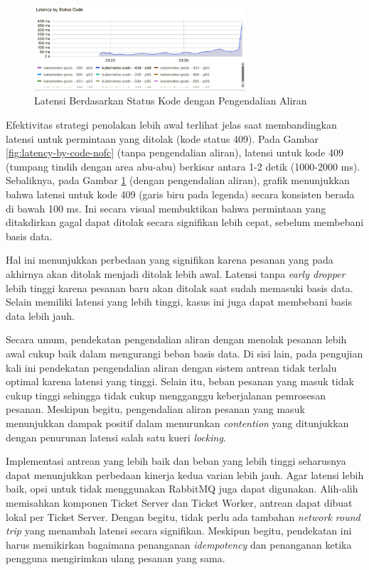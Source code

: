 \begin{figure}[H]
    \centering
    \includegraphics[width=0.7\textwidth]{resources/chapter-4/latency-by-code-fc-pg-stress-0.png}
    \caption{Latensi Berdasarkan Status Kode dengan Pengendalian Aliran}
    \label{fig:latency-by-code-fc}
\end{figure}

Efektivitas strategi penolakan lebih awal terlihat jelas saat membandingkan latensi untuk permintaan yang ditolak (kode status 409). Pada Gambar \ref{fig:latency-by-code-nofc} (tanpa pengendalian aliran), latensi untuk kode 409 (tumpang tindih dengan area abu-abu) berkisar antara 1-2 detik (1000-2000 ms). Sebaliknya, pada Gambar \ref{fig:latency-by-code-fc} (dengan pengendalian aliran), grafik menunjukkan bahwa latensi untuk kode 409 (garis biru pada legenda) secara konsisten berada di bawah 100 ms. Ini secara visual membuktikan bahwa permintaan yang ditakdirkan gagal dapat ditolak secara signifikan lebih cepat, sebelum membebani basis data.

Hal ini menunjukkan perbedaan yang signifikan karena pesanan yang pada akhirnya akan ditolak menjadi ditolak lebih awal. Latensi tanpa \textit{early dropper} lebih tinggi karena pesanan baru akan ditolak saat sudah memasuki basis data. Selain memiliki latensi yang lebih tinggi, kasus ini juga dapat membebani basis data lebih jauh.

Secara umum, pendekatan pengendalian aliran dengan menolak pesanan lebih awal cukup baik dalam mengurangi beban basis data. Di sisi lain, pada pengujian kali ini pendekatan pengendalian aliran dengan sistem antrean tidak terlalu optimal karena latensi yang tinggi. Selain itu, beban pesanan yang masuk tidak cukup tinggi sehingga tidak cukup mengganggu keberjalanan pemrosesan pesanan. Meskipun begitu, pengendalian aliran pesanan yang masuk menunjukkan dampak positif dalam menurunkan \textit{contention} yang ditunjukkan dengan penurunan latensi salah satu kueri \textit{locking}.

Implementasi antrean yang lebih baik dan beban yang lebih tinggi seharusnya dapat menunjukkan perbedaan kinerja kedua varian lebih jauh. Agar latensi lebih baik, opsi untuk tidak menggunakan RabbitMQ juga dapat digunakan. Alih-alih memisahkan komponen Ticket Server dan Ticket Worker, antrean dapat dibuat lokal per Ticket Server. Dengan begitu, tidak perlu ada tambahan \textit{network round trip} yang menambah latensi secara signifikan. Meskipun begitu, pendekatan ini harus memikirkan bagaimana penanganan \textit{idempotency} dan penanganan ketika pengguna mengirimkan ulang pesanan yang sama.

